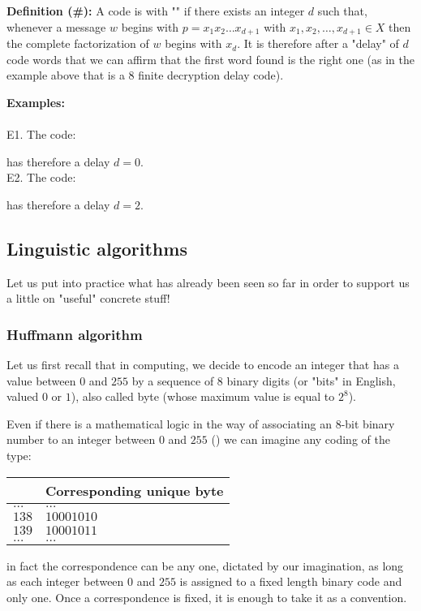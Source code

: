	\pagebreak
	\textbf{Definition (\#\mydef):} A code is with "" if there exists an integer $d$ such that, whenever a message $w$ begins with $p=x_1x_2\ldots x_{d+1}$ with $x_1,x_2,\ldots, x_{d+1}\in X$ then the complete factorization of $w$ begins with $x_d$. It is therefore after a "delay" of $d$ code words that we can affirm that the first word found is the right one (as in the example above that is a $8$ finite decryption delay code).
	\begin{tcolorbox}[colframe=black,colback=white,sharp corners]
	\textbf{{\Large {}}Examples:}\\\\	
	E1. The code:
	
	has therefore a delay $d=0$.\\

	E2. The code:
	
	has therefore a delay $d=2$.
	\end{tcolorbox}
	
	\subsection{Linguistic algorithms}
	Let us put into practice what has already been seen so far in order to support us a little on "useful" concrete stuff!
	
	\subsubsection{Huffmann algorithm}\label{huffman algorithm}
	Let us first recall that in computing, we decide to encode an integer that has a value between $0$ and $255$ by a sequence of $8$ binary digits (or "bits" in English, valued $0$ or $1$), also called byte (whose maximum value is equal to $2^8$).
	
	Even if there is a mathematical logic in the way of associating an $8$-bit binary number to an integer between $0$ and $255$ () we can imagine any coding of the type:
	\begin{table}[H]
		\centering
		\begin{tabular}{|l|l|}
		\hline
		\rowcolor[HTML]{9B9B9B} 
		\multicolumn{1}{|c|}{\cellcolor[HTML]{9B9B9B}Integer} & \multicolumn{1}{c|}{\cellcolor[HTML]{9B9B9B}Corresponding unique byte} \\ \hline
		$\ldots$ & $\ldots$ \\ \hline
		$138$ & $10001010$ \\ \hline
		$139$ & $10001011$ \\ \hline
		$\ldots$ & $\ldots$ \\ \hline
		\end{tabular}
	\end{table}
	in fact the correspondence can be any one, dictated by our imagination, as long as each integer between $0$ and $255$ is assigned to a fixed length binary code and only one. Once a correspondence is fixed, it is enough to take it as a convention.
	
